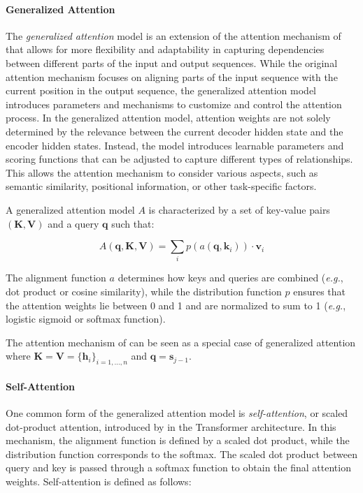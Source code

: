 \paragraph{Generalized Attention} The \textit{generalized attention} model \citep{chaudhari2021attentive} is an extension of the attention mechanism of \citet{bahdanau2014neural} that allows for more flexibility and adaptability in capturing dependencies between different parts of the input and output sequences. While the original attention mechanism focuses on aligning parts of the input sequence with the current position in the output sequence, the generalized attention model introduces parameters and mechanisms to customize and control the attention process. In the generalized attention model, attention weights are not solely determined by the relevance between the current decoder hidden state and the encoder hidden states. Instead, the model introduces learnable parameters and scoring functions that can be adjusted to capture different types of relationships. This allows the attention mechanism to consider various aspects, such as semantic similarity, positional information, or other task-specific factors.

A generalized attention model $A$ is characterized by a set of key-value pairs $(\bm{K}, \bm{V})$ and a query $\bm{q}$ such that:

\begin{equation}
    A(\bm{q}, \bm{K}, \bm{V}) = \sum_i p(a(\bm{q}, \bm{k}_i)) \cdot \bm{v}_i
\end{equation}

\noindent The alignment function $a$ determines how keys and queries are combined (\textit{e.g.}, dot product or cosine similarity), while the distribution function $p$ ensures that the attention weights lie between 0 and 1 and are normalized to sum to 1 (\textit{e.g.}, logistic sigmoid or softmax function).

The attention mechanism of \citet{bahdanau2014neural} can be seen as a special case of generalized attention where $\bm{K} = \bm{V} = \{\bm{h}_i\}_{i=1, \ldots, n}$ and $\bm{q} = \bm{s}_{j-1}$. 


\paragraph{Self-Attention} One common form of the generalized attention model is \textit{self-attention}, or scaled dot-product attention, introduced by \citet{vaswani2017attention} in the Transformer architecture. In this mechanism, the alignment function is defined by a scaled dot product, while the distribution function corresponds to the softmax. The scaled dot product between query and key is passed through a softmax function to obtain the final attention weights. Self-attention is defined as follows:

